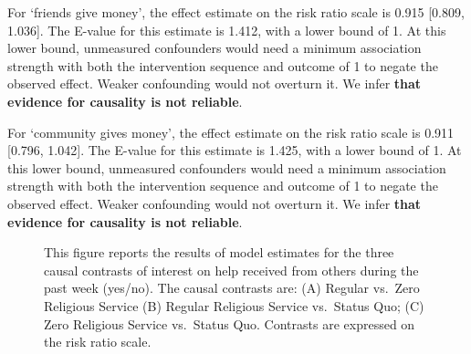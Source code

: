 \documentclass[
  single column]{article}
\begin{document}
For `friends give money', the effect estimate on the risk ratio scale is
0.915 {[}0.809, 1.036{]}. The E-value for this estimate is 1.412, with a
lower bound of 1. At this lower bound, unmeasured confounders would need
a minimum association strength with both the intervention sequence and
outcome of 1 to negate the observed effect. Weaker confounding would not
overturn it. We infer \textbf{that evidence for causality is not
reliable}.

For `community gives money', the effect estimate on the risk ratio scale
is 0.911 {[}0.796, 1.042{]}. The E-value for this estimate is 1.425,
with a lower bound of 1. At this lower bound, unmeasured confounders
would need a minimum association strength with both the intervention
sequence and outcome of 1 to negate the observed effect. Weaker
confounding would not overturn it. We infer \textbf{that evidence for
causality is not reliable}.

\begin{figure}


\caption{\label{fig-study_3}This figure reports the results of model
estimates for the three causal contrasts of interest on help received
from others during the past week (yes/no). The causal contrasts are: (A)
Regular vs.~Zero Religious Service (B) Regular Religious Service
vs.~Status Quo; (C) Zero Religious Service vs.~Status Quo. Contrasts are
expressed on the risk ratio scale.}

\end{figure}%
\end{document}
